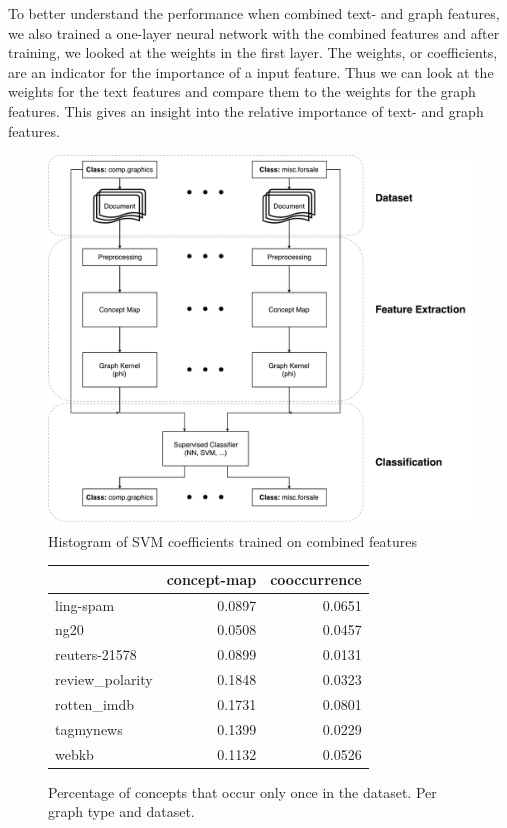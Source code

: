 To better understand the performance when combined text- and graph features, we also trained a one-layer neural network with the combined features and after training, we looked at the weights in the first layer.
The weights, or coefficients, are an indicator for the importance of a input feature.
Thus we can look at the weights for the text features and compare them to the weights for the graph features.
This gives an insight into the relative importance of text- and graph features.



\begin{figure}[ht]
\centering\includegraphics[width=0.6\linewidth]{assets/figures/approach.pdf}
\caption{Histogram of SVM coefficients trained on combined features}
\end{figure}

\begin{figure}[ht]
\centering
\begin{tabular}{lrr}
\toprule
 &  concept-map &  cooccurrence \\
\midrule
ling-spam       &  0.0897 &  0.0651 \\
ng20            &  0.0508 &  0.0457 \\
reuters-21578   &  0.0899 &  0.0131 \\
review\_polarity &  0.1848 &  0.0323 \\
rotten\_imdb     &  0.1731 &  0.0801 \\
tagmynews       &  0.1399 &  0.0229 \\
webkb           &  0.1132 &  0.0526 \\
\bottomrule
\end{tabular}\caption{Percentage of concepts that occur only once in the dataset. Per graph type and dataset.}
\end{figure}

